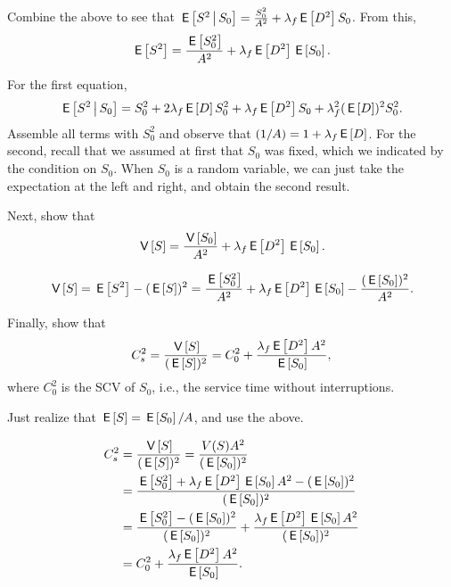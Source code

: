 \begin{exercise}[\faCalculator]
  Combine the above to see that
    $\E{S^2\given S_0} = \frac{S_0^2}{A^2} + \lambda_f \E{D^2} S_0$. From this, 
  \begin{equation*}
    \E{S^2} = \frac{\E{S_0^2}}{A^2} + \lambda_f \E{D^2} \E{S_0}.
  \end{equation*}
  \begin{solution}
For the first equation,
\begin{equation*}
  \E{S^2\given S_0} = S_0^2 + 2\lambda_f \E D S_0^2 + \lambda_f \E{D^2} S_0 + \lambda_f^2 (\E D)^2 S_0^2.
\end{equation*}
Assemble all terms with $S_0^2$ and observe that $(1/A) = 1+\lambda_f \E D$. For the second, recall that we assumed at first that $S_0$ was fixed, which we indicated by the condition on $S_0$. When $S_0$ is a random variable, we can just take the expectation at the left and right, and obtain the second result. 
  \end{solution}
\end{exercise}

\begin{exercise}[\faFlask]
Next, show that  
  \begin{equation*}
    \V{S} = \frac{\V{S_0}}{A^2} + \lambda_f \E{D^2} \E{S_0}.
  \end{equation*}
  \begin{solution}
    \begin{equation*}
    \V{S} = \E{S^2} - (\E S)^2 = 
\frac{\E{S_0^2}}{A^2} + \lambda_f \E{D^2} \E{S_0} -\frac{(\E{S_0})^2}{A^2}.
    \end{equation*}
  \end{solution}
\end{exercise}

\begin{exercise}[\faCalculator]
  Finally, show that
  \begin{equation*}
    C_s^2 = \frac{\V{S}}{(\E S)^2} = C_0^2 + \frac{\lambda_f \E{D^2} A^2}{\E{S_0}},
  \end{equation*}
where $C_0^2$ is the SCV of $S_0$, i.e., the service time without interruptions. 
\begin{hint} Just realize that $\E{S} = \E{S_0}/A$, and use the above.
\end{hint}
\begin{solution}
  \begin{align*}
C_s^2 &= \frac{\V{S}}{(\E S)^2} =\frac{V(S) A^2}{(\E{S_0})^2} \\
&=\frac{\E{S_0^2} + \lambda_f \E{D^2} \E{S_0}A^2 -(\E{S_0})^2}{(\E{S_0})^2} \\
&=\frac{\E{S_0^2} -(\E{S_0})^2}{(\E{S_0})^2} + \frac{\lambda_f \E{D^2} \E{S_0}A^2}{(\E{S_0})^2} \\
&=C_0^2 + \frac{\lambda_f \E{D^2}A^2}{\E{S_0}}.
  \end{align*}
\end{solution}
\end{exercise}

